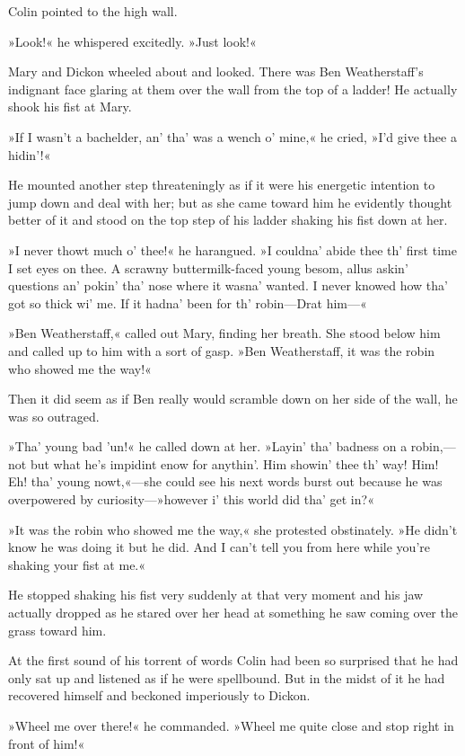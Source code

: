 Colin pointed to the high wall.

»Look!« he whispered excitedly. »Just look!«

Mary and Dickon wheeled about and looked. There was Ben Weatherstaff's indignant face glaring at them over the wall from the top of a ladder! He actually shook his fist at Mary.

»If I wasn't a bachelder, an' tha' was a wench o' mine,« he cried, »I'd give thee a hidin'!«

He mounted another step threateningly as if it were his energetic intention to jump down and deal with her; but as she came toward him he evidently thought better of it and stood on the top step of his ladder shaking his fist down at her.

»I never thowt much o' thee!« he harangued. »I couldna' abide thee th' first time I set eyes on thee. A scrawny buttermilk-faced young besom, allus askin' questions an' pokin' tha' nose where it wasna' wanted. I never knowed how tha' got so thick wi' me. If it hadna' been for th' robin—Drat him—«

»Ben Weatherstaff,« called out Mary, finding her breath. She stood below him and called up to him with a sort of gasp. »Ben Weatherstaff, it was the robin who showed me the way!«

Then it did seem as if Ben really would scramble down on her side of the wall, he was so outraged.

»Tha' young bad 'un!« he called down at her. »Layin' tha' badness on a robin,—not but what he's impidint enow for anythin'. Him showin' thee th' way! Him! Eh! tha' young nowt,«—she could see his next words burst out because he was overpowered by curiosity—»however i' this world did tha' get in?«

»It was the robin who showed me the way,« she protested obstinately. »He didn't know he was doing it but he did. And I can't tell you from here while you're shaking your fist at me.«

He stopped shaking his fist very suddenly at that very moment and his jaw actually dropped as he stared over her head at something he saw coming over the grass toward him.

At the first sound of his torrent of words Colin had been so surprised that he had only sat up and listened as if he were spellbound. But in the midst of it he had recovered himself and beckoned imperiously to Dickon.

»Wheel me over there!« he commanded. »Wheel me quite close and stop right in front of him!«

